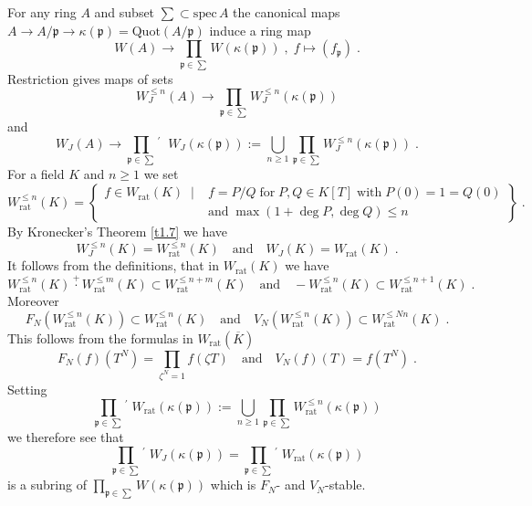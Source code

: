 \documentclass[12pt,leqno]{article}
\newcommand{\dis}{\displaystyle}
\newcommand{\spec}{\mathrm{spec}\,}
\newcommand{\rat}{\mathrm{rat}}
\newcommand{\ep}{\mathfrak{p}}
\newcommand{\oK}{\overline{K}}
\newcommand{\rdp}{\!^{\dis\prime}\;}
\newcommand{\Quot}{\mathrm{Quot}}
\begin{document}
For any ring $A$ and subset ${\scriptstyle\sum} \subset \spec A$ the canonical maps $A \to A / \ep \to \kappa (\ep) = \Quot (A / \ep)$ induce a ring map
\begin{equation}
\label{eq:11}
W (A) \longrightarrow \prod_{\ep \in \sum} W (\kappa (\ep)) \; , \; f \longmapsto (f_{\ep}) \; .
\end{equation}
Restriction gives maps of sets
\begin{equation}
\label{eq:12}
W^{\le n}_J (A) \longrightarrow \prod_{\ep \in \sum} W^{\le n}_J (\kappa (\ep))
\end{equation}
and
\begin{equation}
\label{eq:13}
W_J (A) \longrightarrow \prod_{\ep \in \sum}\rdp \; W_J (\kappa (\ep)) := \bigcup_{n \ge 1} \prod_{\ep \in \sum} W^{\le n}_J (\kappa (\ep)) \; .
\end{equation}
For a field $K$ and $n \ge 1$ we set
\[
W^{\le n}_{\rat} (K) = \left\{ \begin{array}{rl} f \in W_{\rat} (K)\; \mid & f = P / Q \; \text{for} \; P, Q \in K [T] \; \text{with} \; P (0) = 1 = Q (0) \\
& \text{and} \; \max (1 + \deg P , \deg Q) \le n
\end{array} \right\} \; .
\]
By Kronecker's Theorem \ref{t1.7} we have
\begin{equation}
\label{eq:14}
W^{\le n}_J (K) = W^{\le n}_{\rat} (K) \quad \text{and} \quad W_J (K) = W_{\rat} (K) \; .
\end{equation}
It follows from the definitions, that in $W_{\rat} (K)$ we have
\begin{equation}
\label{eq:15}
W^{\le n}_{\rat} (K) \overset{+}{\cdot} W^{\le m}_{\rat} (K) \subset W^{\le n+m}_{\rat} (K) \quad \text{and} \quad -W^{\le n}_{\rat} (K) \subset W^{\le n+1}_{\rat} (K) \; .
\end{equation}
Moreover
\begin{equation}
\label{eq:16}
F_N (W^{\le n}_{\rat} (K)) \subset W^{\le n}_{\rat} (K) \quad \text{and} \quad V_N (W^{\le n}_{\rat} (K)) \subset W^{\le Nn}_{\rat} (K) \; .
\end{equation}
This follows from the formulas in $W_{\rat} (\oK)$
\begin{equation}
\label{eq:17}
F_N (f) (T^N) = \prod_{\zeta^N = 1} f (\zeta T) \quad \text{and} \quad V_N (f) (T) = f (T^N) \; .
\end{equation}
Setting
\[
\prod_{\ep \in \sum}\rdp W_{\rat} (\kappa (\ep)) := \bigcup_{n \ge 1} \prod_{\ep \in \sum} W^{\le n}_{\rat} (\kappa (\ep))
\]
we therefore see that
\begin{equation}
\label{eq:18}
\prod_{\ep \in \sum}\rdp W_J (\kappa (\ep)) = \prod_{\ep \in \sum}\rdp W_{\rat} (\kappa (\ep)) 
\end{equation}
is a subring of $\prod_{\ep \in \sum} W (\kappa (\ep))$ which is $F_N$- and $V_N$-stable.
\end{document}
